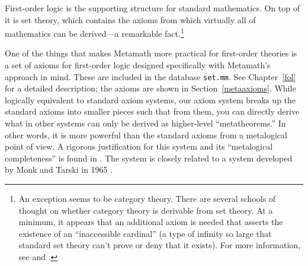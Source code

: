 First-order logic is the supporting structure
for standard mathematics.  On top of it is set theory, which contains
the axioms from which virtually all of mathematics can be derived---a
remarkable fact.\label{categoryth}\footnote{An exception seems
to be category theory.  There are several schools of thought on whether
category theory is derivable from set theory.  At a minimum, it appears
that an additional axiom is needed that asserts the existence of an
``inaccessible cardinal'' (a type of infinity so large that standard set
theory can't prove or deny that it exists).
%
%
For more information, see
\cite[pp.~328--331]{Herrlich} and
\cite{Blass}.}

One of the things that makes Metamath more practical for
first-order theories is a set of axioms for first-order logic designed
specifically with Metamath's approach in mind.  These are included in
the database \texttt{set.mm}.
See Chapter~\ref{fol} for a detailed
description; the axioms are shown in Section~\ref{metaaxioms}.  While
logically equivalent to standard axiom systems, our axiom system breaks
up the standard axioms into smaller pieces such that from them, you can
directly derive what in other systems can only be derived as higher-level
``metatheorems.''  In other words, it is more powerful than
the standard axioms from a metalogical point of view.  A rigorous
justification for this system and its ``metalogical
completeness'' is found in
\cite{Megill}.  The system is closely related to a
system developed by Monk and Tarski in 1965 \cite{Monks}.

